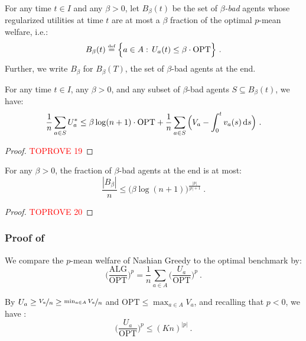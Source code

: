 \documentclass[11pt,letterpaper]{article}
\newcommand{\OPT}{\mathrm{OPT}}
\newcommand{\ALG}{\mathrm{ALG}}
\newcommand{\dif}[1]{\,\text{\rm d} #1}
\newcommand{\utility}{U}
\newcommand{\defeq}{\stackrel{\textrm{\tiny def}}{=}}
\begin{document}
\begin{definition}
	For any time $t\in I$ and any $\beta > 0$, let $B_\beta(t)$ be the set of \emph{$\beta$-bad} agents whose regularized utilities at time $t$ are at most a $\beta$ fraction of the optimal $p$-mean welfare, i.e.:
	\[
	B_{\beta}(t) \defeq \Big\{a\in A:\,\utility_a(t) \leq \beta \cdot \OPT \Big\}
	~.
	\]
	Further, we write $B_\beta$ for $B_\beta(T)$, the set of $\beta$-bad agents at the end.
\end{definition}




\begin{lemma}
	\label{lem:bad-agents-optimal-utility-app}
	For any time $t\in I$, any $\beta > 0$, and any subset of $\beta$-bad agents $S \subseteq B_\beta(t)$, we have:
	\[
	\frac{1}{n} \sum_{a\in S} \utility_a^* 
	\leq \beta \log (n+1) \cdot \OPT + \frac{1}{n} \sum_{a\in S} \Big(V_a-\int_0^t v_a(s) \dif{s} \Big)
	~.
	\]
\end{lemma}

\begin{proof}\textcolor{red}{TOPROVE 19}\end{proof}

\begin{lemma}
	\label{lem:bad-agents-number-app}
	For any $\beta > 0$, the fraction of $\beta$-bad agents at the end is at most:
	\[
	\frac{|B_\beta|}{n} \le \big( \beta \log (n+1) \big)^{\frac{|p|}{|p|+1}}
	~.
	\]
\end{lemma}

\begin{proof}\textcolor{red}{TOPROVE 20}\end{proof}



\subsubsection{Proof of }

We compare the $p$-mean welfare of Nashian Greedy to the optimal benchmark by:
\[
\bigg( \frac{\ALG}{\OPT} \bigg)^p = \frac{1}{n} \sum_{a\in A} \bigg( \frac{\utility_a}{\OPT} \bigg)^p
~.
\]

By $\utility_a \ge \nicefrac{V_a}{n} \ge \nicefrac{\min_{a\in A} V_a}{n}$ and $\OPT \le \max_{a\in A} V_a$, and recalling that $p < 0$, we have :
\[
\bigg(\frac{\utility_a}{\OPT}\bigg)^p \le (Kn)^{|p|}
~.
\]
\end{document}
